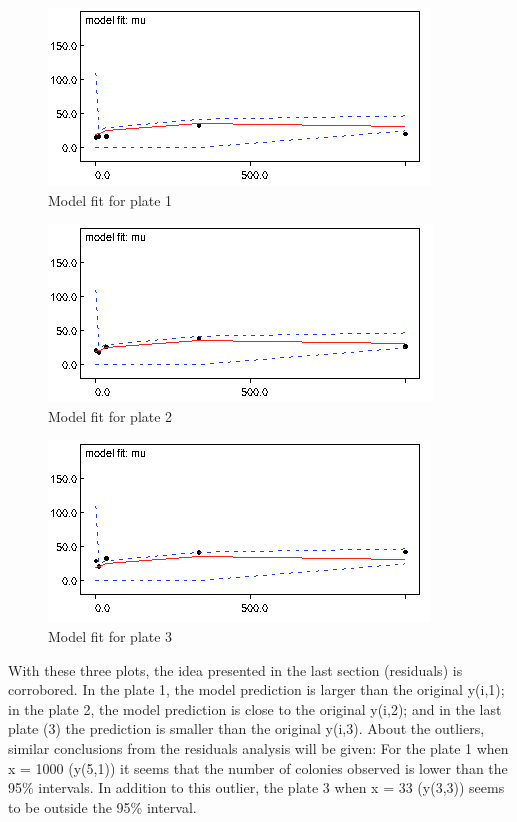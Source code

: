 \documentclass{article}
\begin{document}
  \begin{figure}[ht!]
  \centering
  \includegraphics[width=.6\textwidth]{Figures/8_1.png}
  \caption{Model fit for plate 1}
  \label{fig:fig8}
  \end{figure}
  \begin{figure}[ht!]
  \centering
  \includegraphics[width=.6\textwidth]{Figures/8_2.png}
  \caption{Model fit for plate 2}
  \label{fig:fig8.1}
  \end{figure}  
    \begin{figure}[ht!]
  \centering
  \includegraphics[width=.6\textwidth]{Figures/8_3.png}
  \caption{Model fit for plate 3}
  \label{fig:fig8.2}
  \end{figure}  

With these three plots, the idea presented in the last section (residuals) is corrobored. In the plate 1, the model prediction is larger than the original y(i,1); in the plate 2, the model prediction is close to the original y(i,2); and in the last plate (3) the prediction is smaller than the original y(i,3). About the outliers, similar conclusions from the residuals analysis will be given: For the plate 1 when x = 1000 (y(5,1)) it seems that the number of colonies observed is lower than the 95\% intervals. In addition to this outlier, the plate 3 when x = 33 (y(3,3)) seems to be outside the 95\% interval.
\end{document}
